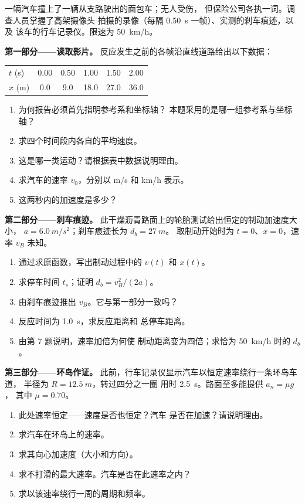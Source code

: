 \begin{problem}
\label{pb:g12:kinematics-2d:1}
一辆汽车撞上了一辆从支路驶出的面包车；无人受伤，
但保险公司各执一词。调查人员掌握了高架摄像头
拍摄的录像（每隔 \qty{0.50}{s} 一帧）、实测的刹车痕迹，以及
该车的行车记录仪。限速为 \qty{50}{km/h}。

\medskip
\noindent\textbf{第一部分——读取影片。}
反应发生之前的各帧沿直线道路给出以下数据：
\begin{center}\small
\begin{tabular}{lccccc}
$t$ (\unit{s}) & 0.00 & 0.50 & 1.00 & 1.50 & 2.00\\
$x$ (\unit{m}) & 0.0 & 9.0 & 18.0 & 27.0 & 36.0
\end{tabular}
\end{center}
\begin{enumerate}
  \item 为何报告必须首先指明参考系和坐标轴？
        本题采用的是哪一组参考系与坐标轴？
  \item 求四个时间段内各自的平均速度。
  \item 这是哪一类运动？请根据表中数据说明理由。
  \item 求汽车的速率 $v_0$，分别以 \unit{m/s} 和 \unit{km/h} 表示。
  \item 这两秒内的加速度是多少？
\end{enumerate}

\medskip
\noindent\textbf{第二部分——刹车痕迹。}
此干燥沥青路面上的轮胎测试给出恒定的制动加速度大小，
$a = \qty{6.0}{m/s^2}$；刹车痕迹长为 $d_b = \qty{27}{m}$。
取制动开始时为 $t = 0$、$x = 0$，速率 $v_B$ 未知。
\begin{enumerate}[resume]
  \item 通过求原函数，写出制动过程中的 $v(t)$ 和 $x(t)$。
  \item 求停车时间 $t_s$；证明 $d_b = v_B^2/(2a)$。
  \item 由刹车痕迹推出 $v_B$。它与第一部分一致吗？
  \item 反应时间为 \qty{1.0}{s}，求反应距离和
        总停车距离。
  \item 由第 7 题说明，速率加倍为何使
        制动距离变为四倍；求恰为 \qty{50}{km/h} 时的 $d_b$。
\end{enumerate}

\medskip
\noindent\textbf{第三部分——环岛作证。}
此前，行车记录仪显示汽车以恒定速率绕行一条环岛车道，
半径为 $R = \qty{12.5}{m}$，转过四分之一圈
用时 \qty{2.5}{s}。路面至多能提供 $a_n = \mu g$，
其中 $\mu = 0.70$。
\begin{enumerate}[resume]
  \item 此处速率恒定——速度是否也恒定？汽车
        是否在加速？请说明理由。
  \item 求汽车在环岛上的速率。
  \item 求其向心加速度（大小和方向）。
  \item 求不打滑的最大速率。汽车是否在此速率之内？
  \item 求以该速率绕行一周的周期和频率。
\end{enumerate}


\end{problem}
